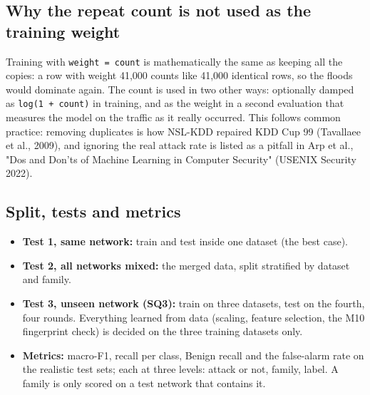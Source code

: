 \documentclass[10pt,a4paper]{article}
\newenvironment{problem}{\par\noindent\begin{minipage}{\linewidth}\setlength{\parskip}{4pt}}{\end{minipage}\par\bigskip}
\begin{document}
\begin{problem}\subsection{Why the repeat count is not used as the training weight}
Training with \texttt{weight = count} is mathematically the same as keeping all the copies: a row with weight 41,000 counts like 41,000 identical rows, so the floods would dominate again. The count is used in two other ways: optionally damped as \texttt{log(1 + count)} in training, and as the weight in a second evaluation that measures the model on the traffic as it really occurred. This follows common practice: removing duplicates is how NSL-KDD repaired KDD Cup 99 (Tavallaee et al., 2009), and ignoring the real attack rate is listed as a pitfall in Arp et al., "Dos and Don'ts of Machine Learning in Computer Security" (USENIX Security 2022).

\end{problem}
\begin{problem}\subsection{Split, tests and metrics}
\begin{itemize}
\item \textbf{Test 1, same network:} train and test inside one dataset (the best case).
\item \textbf{Test 2, all networks mixed:} the merged data, split stratified by dataset and family.
\item \textbf{Test 3, unseen network (SQ3):} train on three datasets, test on the fourth, four rounds. Everything learned from data (scaling, feature selection, the M10 fingerprint check) is decided on the three training datasets only.
\item \textbf{Metrics:} macro-F1, recall per class, Benign recall and the false-alarm rate on the realistic test sets; each at three levels: attack or not, family, label. A family is only scored on a test network that contains it.
\end{itemize}
\end{problem}
\end{document}
